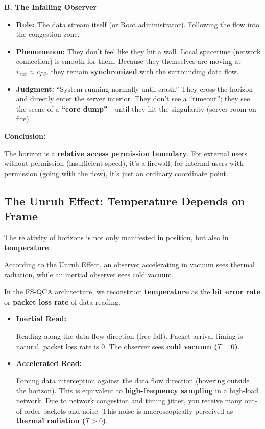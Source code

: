 \documentclass[11pt,a4paper,twoside]{book}
\begin{document}
\textbf{B. The Infalling Observer}

\begin{itemize}
\item \textbf{Role:} The data stream itself (or Root administrator). Following the flow into the congestion zone.

\item \textbf{Phenomenon:} They don't feel like they hit a wall. Local spacetime (network connection) is smooth for them. Because they themselves are moving at \textbf{$v_{ext} \approx c_{FS}$}, they remain \textbf{synchronized} with the surrounding data flow.

\item \textbf{Judgment:} ``System running normally until crash.'' They cross the horizon and directly enter the server interior. They don't see a ``timeout''; they see the scene of a \textbf{``core dump''}---until they hit the singularity (server room on fire).
\end{itemize}

\textbf{Conclusion:}

The horizon is a \textbf{relative access permission boundary}. For external users without permission (insufficient speed), it's a firewall; for internal users with permission (going with the flow), it's just an ordinary coordinate point.

\subsection{The Unruh Effect: Temperature Depends on Frame}

The relativity of horizons is not only manifested in position, but also in \textbf{temperature}.

According to the Unruh Effect, an observer accelerating in vacuum sees thermal radiation, while an inertial observer sees cold vacuum.

In the FS-QCA architecture, we reconstruct \textbf{temperature} as the \textbf{bit error rate} or \textbf{packet loss rate} of data reading.

\begin{itemize}
\item \textbf{Inertial Read:}

    Reading along the data flow direction (free fall). Packet arrival timing is natural, packet loss rate is 0. The observer sees \textbf{cold vacuum ($T=0$)}.

\item \textbf{Accelerated Read:}

    Forcing data interception against the data flow direction (hovering outside the horizon). This is equivalent to \textbf{high-frequency sampling} in a high-load network. Due to network congestion and timing jitter, you receive many out-of-order packets and noise. This noise is macroscopically perceived as \textbf{thermal radiation ($T > 0$)}.
\end{itemize}
\end{document}
